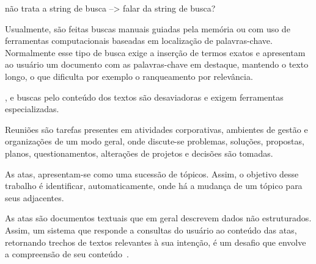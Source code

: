
não trata a string de busca --> falar da string de busca?








Usualmente, são feitas buscas manuais guiadas pela memória ou com uso de ferramentas computacionais baseadas em localização de palavras-chave. Normalmente esse tipo de busca exige a inserção de termos exatos e apresentam ao usuário um documento com as palavras-chave em destaque, mantendo o texto longo, o que dificulta por exemplo o ranqueamento por relevância. 


, e buscas pelo conteúdo dos textos são desaviadoras e exigem ferramentas especializadas.


Reuniões são tarefas presentes em atividades corporativas, ambientes de gestão e organizações de um modo geral, onde discute-se problemas, soluções, propostas, planos, questionamentos, alterações de projetos e decisões são tomadas. 



As atas, apresentam-se como uma sucessão de tópicos. Assim, o objetivo desse trabalho é identificar, automaticamente, onde há a mudança de um tópico para seus adjacentes.




As atas são documentos textuais que em geral descrevem dados não estruturados. Assim, um sistema que responde a consultas do usuário ao conteúdo das atas, retornando trechos de textos relevantes à sua intenção, é um desafio que envolve a compreensão de seu conteúdo~\cite{Bokaei2015}. 


